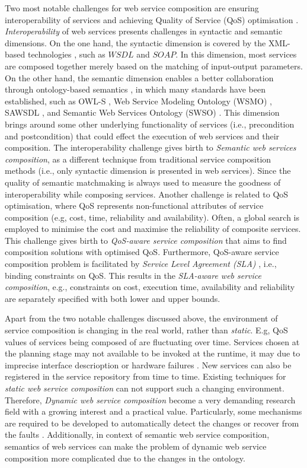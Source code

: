 Two most notable challenges for web service composition are ensuring interoperability of services and achieving Quality of Service (QoS) optimisation \cite{fensel2011semantic}. \emph{Interoperability} of web services presents challenges in syntactic and semantic dimensions. On the one hand, the syntactic dimension is covered by the XML-based technologies \cite{yu2008deploying}, such as $WSDL$ and $SOAP$. In this dimension, most services are composed together merely based on the matching of input-output parameters. On the other hand, the semantic dimension enables a better collaboration through ontology-based semantics \cite{o2005review}, in which many standards have been established, such as OWL-S \cite{martin2004owl}, Web Service Modeling Ontology (WSMO) \cite{lausen2005w3c}, SAWSDL \cite{kopecky2007sawsdl}, and Semantic Web Services Ontology (SWSO) \cite{petrie2016web}. This dimension brings around some other underlying functionality of services (i.e., precondition and postcondition) that could effect the execution of web services and their composition. The interoperability challenge gives birth to \emph{Semantic web services composition}, as a different technique from traditional service composition methods (i.e., only syntactic dimension is presented in web services). Since the quality of semantic matchmaking is always used to measure the goodness of interoperability while composing services. Another challenge is related to QoS optimisation, where QoS represents non-functional attributes of service composition (e.g, cost, time, reliability and availability). Often, a global search is employed to minimise the cost and maximise the reliability of composite services. This challenge gives birth to \emph{QoS-aware service composition} that aims to find composition solutions with optimised QoS. Furthermore, QoS-aware service composition problem is facilitated by \emph{Service Level Agreement (SLA)} \cite{sahai2002automated}, i.e., binding constraints on QoS. This results in the \emph{SLA-aware web service composition}, e.g., constraints on cost, execution time, availability and reliability are separately specified with both lower and upper bounds.

Apart from the two notable challenges discussed above, the environment of service composition is changing in the real world, rather than \emph{static}. E.g, QoS values of services being composed of are fluctuating over time. Services chosen at the planning stage may not available to be invoked at the runtime, it may due to imprecise interface descrioption \cite{ishikawa2011bridging} or hardware failures \cite{guinard2009discovery}. New services can also be registered in the service repository from time to time. Existing techniques for \emph{static web service composition} can not support such a changing environment. Therefore, \emph{Dynamic web service composition} become a very demanding research field with a growing interest and a practical value. Particularly, some mechanisms are required to be developed to automatically detect the changes or recover from the faults \cite{chan2009fault}. Additionally, in context of semantic web service composition, semantics of web services can make the problem of dynamic web service composition more complicated due to the changes in the ontology.


